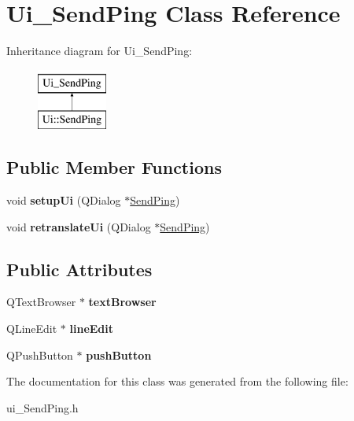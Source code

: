 \hypertarget{class_ui___send_ping}{\section{Ui\-\_\-\-Send\-Ping Class Reference}
\label{class_ui___send_ping}
}
Inheritance diagram for Ui\-\_\-\-Send\-Ping\-:\begin{figure}[H]
\begin{center}
\leavevmode
\includegraphics[height=2.000000cm]{class_ui___send_ping}
\end{center}
\end{figure}
\subsection*{Public Member Functions}
\begin{DoxyCompactItemize}
\item 
\hypertarget{class_ui___send_ping_a2827958d3a69635eebb9c1a23e4f3298}{void {\bfseries setup\-Ui} (Q\-Dialog $\ast$\hyperlink{class_send_ping}{Send\-Ping})}\label{class_ui___send_ping_a2827958d3a69635eebb9c1a23e4f3298}

\item 
\hypertarget{class_ui___send_ping_af4b21c2cb71a02d9255d0e7039b15146}{void {\bfseries retranslate\-Ui} (Q\-Dialog $\ast$\hyperlink{class_send_ping}{Send\-Ping})}\label{class_ui___send_ping_af4b21c2cb71a02d9255d0e7039b15146}

\end{DoxyCompactItemize}
\subsection*{Public Attributes}
\begin{DoxyCompactItemize}
\item 
\hypertarget{class_ui___send_ping_a75b0641da8b6d5463e14e261467b4f0c}{Q\-Text\-Browser $\ast$ {\bfseries text\-Browser}}\label{class_ui___send_ping_a75b0641da8b6d5463e14e261467b4f0c}

\item 
\hypertarget{class_ui___send_ping_a23aad6e33a24d42e993006880712fe61}{Q\-Line\-Edit $\ast$ {\bfseries line\-Edit}}\label{class_ui___send_ping_a23aad6e33a24d42e993006880712fe61}

\item 
\hypertarget{class_ui___send_ping_ad207b0d8d04cdb5c77a8ea84f0048d2b}{Q\-Push\-Button $\ast$ {\bfseries push\-Button}}\label{class_ui___send_ping_ad207b0d8d04cdb5c77a8ea84f0048d2b}

\end{DoxyCompactItemize}


The documentation for this class was generated from the following file\-:\begin{DoxyCompactItemize}
\item 
ui\-\_\-\-Send\-Ping.\-h\end{DoxyCompactItemize}
